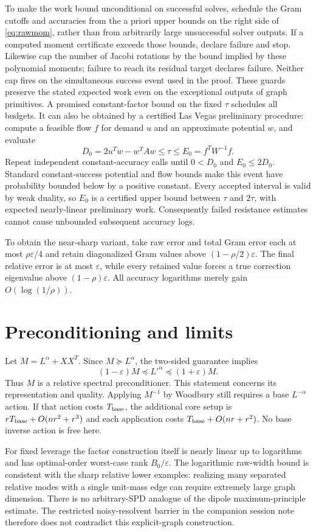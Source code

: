 \documentclass[11pt]{article}
\begin{document}
To make the work bound unconditional on successful solves, schedule the
Gram cutoffs and accuracies from the a priori upper bounds on the
right side of \eqref{eq:rawmom}, rather than from arbitrarily large
unsuccessful solver outputs. If a computed moment certificate exceeds
those bounds, declare failure and stop. Likewise cap the number of
Jacobi rotations by the bound implied by these polynomial moments;
failure to reach its residual target declares failure. Neither cap
fires on the simultaneous success event used in the proof. These
guards preserve the stated expected work even on the exceptional
outputs of graph primitives. A promised constant-factor bound on the
fixed $\tau$ schedules all budgets. It can also be obtained by a
certified Las Vegas preliminary procedure: compute a feasible flow
$f$ for demand $u$ and an approximate potential $w$, and evaluate
\[
 D_0=2u^Tw-w^TAw\le\tau\le E_0=f^TW^{-1}f.
\]
Repeat independent constant-accuracy calls until
$0<D_0$ and $E_0\le2D_0$. Standard constant-success potential and
flow bounds make this event have probability bounded below by a
positive constant. Every accepted interval is valid by weak duality,
so $E_0$ is a certified upper bound between $\tau$ and $2\tau$,
with expected nearly-linear preliminary work. Consequently failed
resistance estimates cannot cause unbounded subsequent accuracy logs.

To obtain the near-sharp variant, take raw error and total Gram error
each at most $\rho\varepsilon/4$ and retain diagonalized Gram values
above $(1-\rho/2)\varepsilon$. The final relative error is at most
$\varepsilon$, while every retained value forces a true correction
eigenvalue above $(1-\rho)\varepsilon$. All accuracy logarithms merely
gain $O(\log(1/\rho))$.

\section{Preconditioning and limits}
Let $M=L^\alpha+XX^T$. Since $M\succeq L^\alpha$, the two-sided
guarantee implies
\[
 (1-\varepsilon)M\preceq L'^\alpha\preceq(1+\varepsilon)M.
\]
Thus $M$ is a relative spectral preconditioner. This statement concerns
its representation and quality. Applying $M^{-1}$ by Woodbury still
requires a base $L^{-\alpha}$ action. If that action costs $T_{\rm base}$,
the additional core setup is
$rT_{\rm base}+O(nr^2+r^3)$ and each application costs
$T_{\rm base}+O(nr+r^2)$. No base inverse action is free here.

For fixed leverage the factor construction itself is nearly linear
up to logarithms and has optimal-order worst-case rank $B_0/\varepsilon$.
The logarithmic raw-width bound is consistent with the sharp relative
lower examples: realizing many separated relative modes with a single
unit-mass edge can require extremely large graph dimension. There is
no arbitrary-SPD analogue of the dipole maximum-principle estimate.
The restricted noisy-resolvent barrier in the companion session note
therefore does not contradict this explicit-graph construction.
\end{document}
